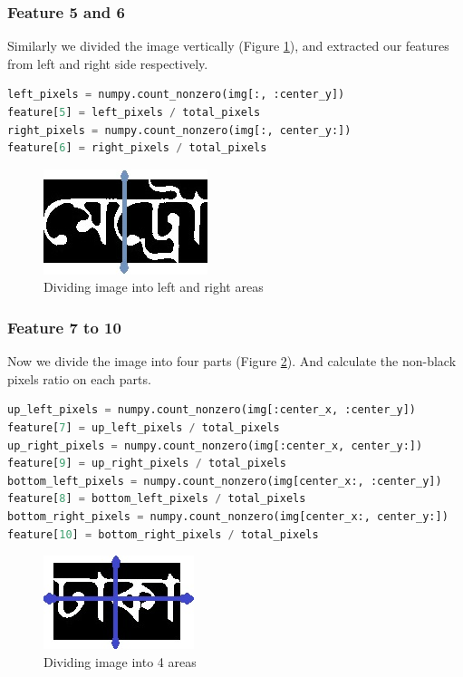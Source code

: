 \documentclass{standalone}
\begin{document}
\subsubsection{Feature 5 and 6}
Similarly we divided the image vertically (Figure \ref{fig:FeatureVer}), and extracted our features from left and right side respectively.
\begin{lstlisting}[language=Python]
left_pixels = numpy.count_nonzero(img[:, :center_y])
feature[5] = left_pixels / total_pixels
right_pixels = numpy.count_nonzero(img[:, center_y:])
feature[6] = right_pixels / total_pixels
\end{lstlisting}

\begin{figure}
\centering
\includegraphics{./img/feature/ver}
\caption{Dividing image into left and right areas}
\label{fig:FeatureVer}
\end{figure}


\subsubsection{Feature 7 to 10}
Now we divide the image into four parts (Figure \ref{fig:FeatureFours}). And calculate the non-black pixels ratio on each parts.
\begin{lstlisting}[language=Python]
up_left_pixels = numpy.count_nonzero(img[:center_x, :center_y])
feature[7] = up_left_pixels / total_pixels
up_right_pixels = numpy.count_nonzero(img[:center_x, center_y:])
feature[9] = up_right_pixels / total_pixels
bottom_left_pixels = numpy.count_nonzero(img[center_x:, :center_y])
feature[8] = bottom_left_pixels / total_pixels
bottom_right_pixels = numpy.count_nonzero(img[center_x:, center_y:])
feature[10] = bottom_right_pixels / total_pixels
\end{lstlisting}

\begin{figure}
\centering
\includegraphics{./img/feature/fours}
\caption{Dividing image into 4 areas}
\label{fig:FeatureFours}
\end{figure}
\end{document}
